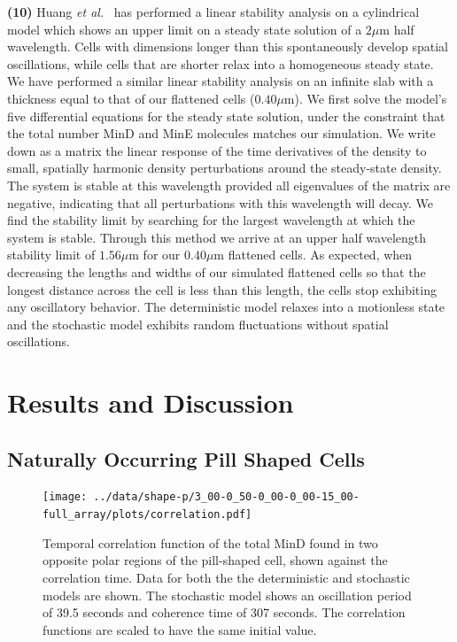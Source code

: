 \documentclass[10pt,letterpaper]{article}
\newcommand\micron{\ensuremath{\mu\text{m}}}
\newcommand{\blue}[1]{{\bf \color{blue} #1}}
\begin{document}
\blue{(10)}  Huang \emph{et al.}~\cite{huang2003dynamic} has performed a linear
stability analysis on a cylindrical model which shows an upper limit
on a steady state solution of a $2\micron$ half wavelength.  Cells
with dimensions longer than this spontaneously develop spatial
oscillations, while cells that are shorter relax into a homogeneous
steady state.  We have performed a similar linear stability analysis
on an infinite slab with a thickness equal to that of our flattened
cells ($0.40\micron$).  We first solve the model's five differential
equations for the steady state solution, under the constraint that the
total number MinD and MinE molecules matches our simulation.  We write
down as a matrix the linear response of the time derivatives of the
density to small, spatially harmonic density perturbations around the
steady-state density.  The system is stable at this wavelength
provided all eigenvalues of the matrix are negative, indicating that
all perturbations with this wavelength will decay.  We find the
stability limit by searching for the largest wavelength at which the
system is stable.  Through this method we arrive at an upper half
wavelength stability limit of $1.56\micron$ for our $0.40\micron$
flattened cells. As expected, when decreasing the lengths and widths
of our simulated flattened cells so that the longest distance across
the cell is less than this length, the cells stop exhibiting any
oscillatory behavior.  The deterministic model relaxes into a
motionless state and the stochastic model exhibits random fluctuations
without spatial oscillations.

\section*{Results and Discussion}
\subsection*{Naturally Occurring Pill Shaped Cells}


\begin{figure}
  \begin{center}
    \texttt{[image: ../data/shape-p/3\_00-0\_50-0\_00-0\_00-15\_00-full\_array/plots/correlation.pdf]}
  \end{center}
  \caption{Temporal correlation function of the total MinD found in
    two opposite polar regions of the pill-shaped cell, shown against
    the correlation time.  Data for both the the deterministic and
    stochastic models are shown.  The stochastic model shows an
    oscillation period of 39.5 seconds and coherence time of 307 seconds.
    The correlation functions are scaled to have the same initial
    value.}
  \label{corr-pill}
\end{figure}
\end{document}
